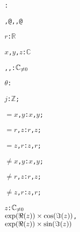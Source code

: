 \begin{alltt}
: 

   , @, , @

  \(r\):  \(\mathbb{R}\)\vspace*{\pvsdeclspacing}

  \(x\), \(y\), \(z\):  \(\mathbb{C}\)\vspace*{\pvsdeclspacing}

  , , :  \({\pvssubscript{\mathbb{C}}{{\not=}0}}\)\vspace*{\pvsdeclspacing}

  \(\theta\):  \vspace*{\pvsdeclspacing}

  \(j\):  \(\mathbb{Z}\);\vspace*{\pvsdeclspacing}

  \(=\)\pvsid{(}\(x\), \(y\)\pvsid{)}:   \pvskey{=} \pvsid{(}\(x\), \(y\)\pvsid{)};\vspace*{\pvsdeclspacing}

  \(=\)\pvsid{(}\(r\), \(z\)\pvsid{)}:   \pvskey{=} \pvsid{(}\(r\), \(z\)\pvsid{)};\vspace*{\pvsdeclspacing}

  \(=\)\pvsid{(}\(z\), \(r\)\pvsid{)}:   \pvskey{=} \pvsid{(}\(z\), \(r\)\pvsid{)};\vspace*{\pvsdeclspacing}

  \(\neq\)\pvsid{(}\(x\), \(y\)\pvsid{)}:   \pvskey{=} \pvsid{(}\(x\), \(y\)\pvsid{)};\vspace*{\pvsdeclspacing}

  \(\neq\)\pvsid{(}\(r\), \(z\)\pvsid{)}:   \pvskey{=} \pvsid{(}\(r\), \(z\)\pvsid{)};\vspace*{\pvsdeclspacing}

  \(\neq\)\pvsid{(}\(z\), \(r\)\pvsid{)}:   \pvskey{=} \pvsid{(}\(z\), \(r\)\pvsid{)};\vspace*{\pvsdeclspacing}

  \pvsid{(}\(z\)\pvsid{)}: \({\pvssubscript{\mathbb{C}}{{\not=}0}}\) \pvskey{=}
      \pvsid{(}\(\optimestwofn{\pvsid{exp}\pvsid{(}\Reonefn{z}\pvsid{)}}{\pvsid{cos}\pvsid{(}\Imonefn{z}\pvsid{)}}\),
                \(\optimestwofn{\pvsid{exp}\pvsid{(}\Reonefn{z}\pvsid{)}}{\pvsid{sin}\pvsid{(}\Imonefn{z}\pvsid{)}}\)\pvsid{)}\vspace*{\pvsdeclspacing}


\end{alltt}
